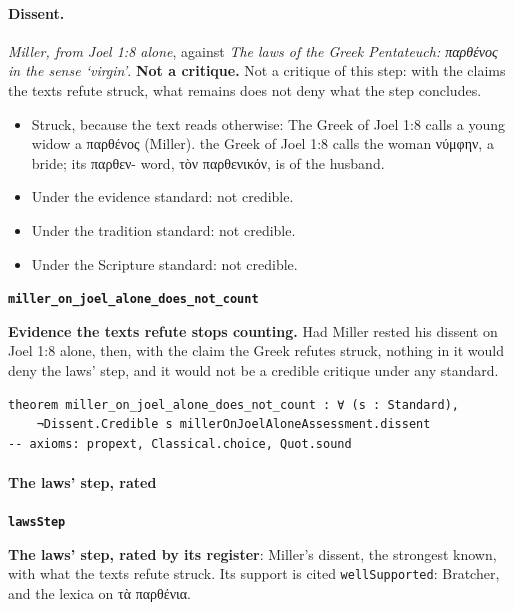 \documentclass[11pt]{article}
\begin{document}
\paragraph{Dissent.} \emph{Miller, from Joel 1:8 alone}, against \emph{The laws of the Greek Pentateuch: παρθένος in the sense ‘virgin’}. \textbf{Not a critique.} Not a critique of this step: with the claims the texts refute struck, what remains does not deny what the step concludes.
\begin{itemize}
\item Struck, because the text reads otherwise: The Greek of Joel 1:8 calls a young widow a παρθένος (Miller). the Greek of Joel 1:8 calls the woman νύμφην, a bride; its παρθεν- word, τὸν παρθενικόν, is of the husband.
\item Under the evidence standard: not credible.
\item Under the tradition standard: not credible.
\item Under the Scripture standard: not credible.
\end{itemize}
\par\medskip\noindent\textbf{\texttt{miller\_\allowbreak{}on\_\allowbreak{}joel\_\allowbreak{}alone\_\allowbreak{}does\_\allowbreak{}not\_\allowbreak{}count}}\par\nobreak\noindent
\textbf{Evidence the texts refute stops counting.} Had Miller rested his dissent on Joel 1:8 alone, then, with the claim the Greek refutes struck, nothing in it would deny the laws’ step, and it would not be a credible critique under any standard.

{\small\begin{verbatim}
theorem miller_on_joel_alone_does_not_count : ∀ (s : Standard),
    ¬Dissent.Credible s millerOnJoelAloneAssessment.dissent
-- axioms: propext, Classical.choice, Quot.sound
\end{verbatim}}
\paragraph*{The laws’ step, rated}
\leavevmode\par\nobreak
\par\medskip\noindent\textbf{\texttt{laws\allowbreak{}Step}}\par\nobreak\noindent
\textbf{The laws’ step, rated by its register}: Miller’s dissent, the strongest known, with what the texts refute struck. Its support is cited \texttt{well\allowbreak{}Supported}: Bratcher, and the lexica on τὰ παρθένια.
\end{document}
